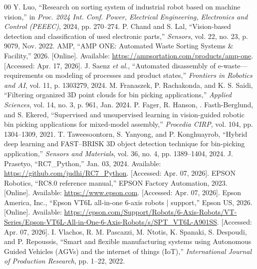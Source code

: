 \documentclass[conference]{IEEEtran}
\begin{document}
\begin{thebibliography}{00}
Y. Luo, ``Research on sorting system of industrial robot based on machine vision,'' in \textit{Proc. 2024 Int. Conf. Power, Electrical Engineering, Electronics and Control (PEEEC)}, 2024, pp. 270--274.
P. Chand and S. Lal, ``Vision-based detection and classification of used electronic parts,'' \textit{Sensors}, vol. 22, no. 23, p. 9079, Nov. 2022.
AMP, ``AMP ONE: Automated Waste Sorting Systems \& Facility,'' 2026. [Online]. Available: \url{https://ampsortation.com/products/amp-one}. [Accessed: Apr. 17, 2026].
J. Saenz \textit{et al.}, ``Automated disassembly of e-waste---requirements on modeling of processes and product states,'' \textit{Frontiers in Robotics and AI}, vol. 11, p. 1303279, 2024.
M. Franaszek, P. Rachakonda, and K. S. Saidi, ``Filtering organized 3D point clouds for bin picking applications,'' \textit{Applied Sciences}, vol. 14, no. 3, p. 961, Jan. 2024.
P. Fager, R. Hanson, \text{\AA}. Fasth-Berglund, and S. Ekered, ``Supervised and unsupervised learning in vision-guided robotic bin picking applications for mixed-model assembly,'' \textit{Procedia CIRP}, vol. 104, pp. 1304--1309, 2021.
T. Taweesoontorn, S. Yanyong, and P. Konghuayrob, ``Hybrid deep learning and FAST--BRISK 3D object detection technique for bin-picking application,'' \textit{Sensors and Materials}, vol. 36, no. 4, pp. 1389--1404, 2024.
J. Prasetyo, ``RC7\_Python,'' Jan. 03, 2024. Available: \url{https://github.com/judhi/RC7_Python}. [Accessed: Apr. 07, 2026].
 EPSON Robotics, ``RC8.0 reference manual,'' EPSON Factory Automation, 2023. [Online]. Available: \url{https://www.epson.com}. [Accessed: Apr. 07, 2026].
Epson America, Inc., ``Epson VT6L all-in-one 6-axis robots | support,'' Epson US, 2026. [Online]. Available: \url{https://epson.com/Support/Robots/6-Axis-Robots/VT-Series/Epson-VT6L-All-in-One-6-Axis-Robots/s/SPT_VT6L-A901SS}. [Accessed: Apr. 07, 2026].
I. Vlachos, R. M. Pascazzi, M. Ntotis, K. Spanaki, S. Despoudi, and P. Repoussis, ``Smart and flexible manufacturing systems using Autonomous Guided Vehicles (AGVs) and the internet of things (IoT),'' \textit{International Journal of Production Research}, pp. 1--22, 2022.
\end{thebibliography}
\end{document}

